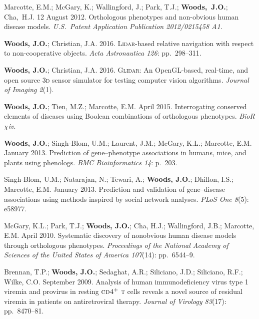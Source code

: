 \documentclass[12pt,letterpaper]{article}
\newcommand{\mhead}[1]{\leavevmode\marginpar{\sffamily\footnotesize #1}}
\begin{document}
\newpage
\mhead{Patents}%
\par\vspace{-\baselineskip}Marcotte, E.M.; McGary, K.; Wallingford, J.; Park, T.J.; \textbf{Woods,~J.O.}; Cha,~H.J. 12 August 2012. Orthologous phenotypes and non-obvious human disease models. \textit{U.S.\ Patent Application Publication 2012/0215458 A1}.

\bigskip
\mhead{Articles}%
\par\vspace{-\baselineskip}\textbf{Woods, J.O.}; Christian, J.A. 2016. \textsc{Lidar}-based relative navigation with respect to non-cooperative objects. \textit{Acta Astronautica 126}: pp.\ 298--311.

\medskip
\par\textbf{Woods, J.O.}; Christian, J.A. 2016. \textsc{Glidar}: An OpenGL-based, real-time, and open source 3\textsc{d} sensor simulator for testing computer vision algorithms. \textit{Journal of Imaging 2}(1).

\medskip
\par\textbf{Woods, J.O.}; Tien, M.Z.; Marcotte, E.M. April 2015. Interrogating conserved elements of diseases using Boolean combinations of orthologous phenotypes. \textit{BioR$\chi$iv}.

\medskip
\par\textbf{Woods, J.O.}; Singh-Blom, U.M.; Laurent, J.M.; McGary, K.L.; Marcotte, E.M. January 2013. Prediction of gene--phenotype associations in humans, mice, and plants using phenologs. \textit{BMC Bioinformatics 14}: p.\ 203.

\medskip
\par Singh-Blom, U.M.; Natarajan, N.; Tewari, A.; \textbf{Woods, J.O.}; Dhillon, I.S.; Marcotte, E.M. January 2013. Prediction and validation of gene--disease associations using methods inspired by social network analyses. \textit{PLoS One 8}(5): e58977.

\medskip
\par McGary, K.L.; Park, T.J.; \textbf{Woods, J.O.}; Cha, H.J.; Wallingford, J.B.; Marcotte, E.M. April 2010. Systematic discovery of nonobvious human disease models through orthologous phenotypes. \textit{Proceedings of the National Academy of Sciences of the United States of America 107}(14): pp.\ 6544--9.

\medskip
\par Brennan, T.P.; \textbf{Woods, J.O.}; Sedaghat, A.R.; Siliciano, J.D.; Siliciano, R.F.; Wilke, C.O. September 2009. Analysis of human immunodeficiency virus type 1 viremia and provirus in resting $\textsc{cd4}^{+}$ \textsc{t} cells reveals a novel source of residual viremia in patients on antiretroviral therapy. \textit{Journal of Virology 83}(17): pp.\ 8470--81.
\end{document}
